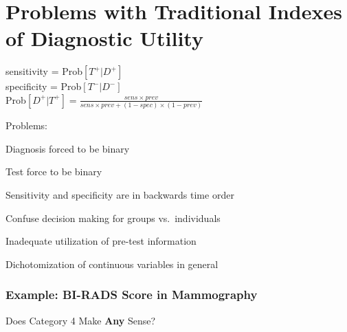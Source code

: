 \section{Problems with Traditional Indexes of Diagnostic Utility}

sensitivity = Prob$[T^{+} | D^{+}]$\\
\bigskip
specificity = Prob$[T^{-} | D^{-}]$\\
\bigskip
Prob$[D^{+} | T^{+}] = \frac{sens \times prev}{sens \times prev +
(1-spec)\times (1-prev)}$

Problems:
\bi
\item Diagnosis forced to be binary
\item Test force to be binary
\item Sensitivity and specificity are in backwards time order
\item Confuse decision making for groups vs.\ individuals
\item Inadequate utilization of pre-test information
\item Dichotomization of continuous variables in general
\ei

\subsubsection{Example: BI-RADS Score in Mammography}
Does Category 4 Make \textbf{Any} Sense?

